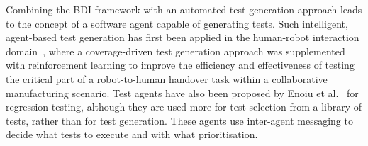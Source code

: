 \documentclass[letterpaper, 10 pt, journal, twoside]{IEEEtran}
\begin{document}
%
%

Combining the BDI framework with an automated test generation approach leads to the concept of a software agent capable of generating tests.
Such intelligent, agent-based test generation has first been applied in the human-robot interaction domain~\cite{Araiza-Illan2016}, where a coverage-driven test generation approach was supplemented with reinforcement learning to improve the efficiency and effectiveness of testing the critical part of a robot-to-human handover task within a collaborative manufacturing scenario. 
%
Test agents have also been proposed by Enoiu et al.~\cite{Enoiu2019} for regression testing, although they are used more for test selection from a library of tests, rather than for test generation. These agents use inter-agent messaging to decide what tests to execute and with what prioritisation.
%
\end{document}
